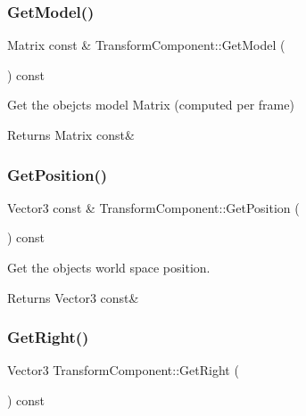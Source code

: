 \subsubsection{\texorpdfstring{Get\+Model()}{GetModel()}}
{\footnotesize\ttfamily Matrix const  \& Transform\+Component\+::\+Get\+Model (\begin{DoxyParamCaption}{ }\end{DoxyParamCaption}) const}



Get the obejct\textquotesingle{}s model Matrix (computed per frame) 

\begin{DoxyReturn}{Returns}
Matrix const\& 
\end{DoxyReturn}
\mbox{\label{classTransformComponent_a31ce3a262b59b97eadd0187319ed812d}} 
\subsubsection{\texorpdfstring{Get\+Position()}{GetPosition()}}
{\footnotesize\ttfamily Vector3 const  \& Transform\+Component\+::\+Get\+Position (\begin{DoxyParamCaption}{ }\end{DoxyParamCaption}) const}



Get the object\textquotesingle{}s world space position. 

\begin{DoxyReturn}{Returns}
Vector3 const\& 
\end{DoxyReturn}
\mbox{\label{classTransformComponent_a5fe2a35d3bcb6a07a231b0f463d6a64b}} 
\subsubsection{\texorpdfstring{Get\+Right()}{GetRight()}}
{\footnotesize\ttfamily Vector3 Transform\+Component\+::\+Get\+Right (\begin{DoxyParamCaption}{ }\end{DoxyParamCaption}) const}




